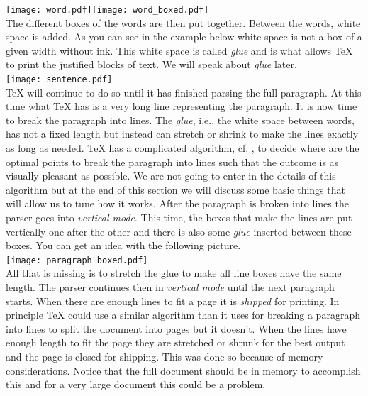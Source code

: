 \documentclass[a4paper]{article}
\begin{document}
\noindent\hfil\texttt{[image: word.pdf]}\hfil\texttt{[image: word\_boxed.pdf]}\hfil\\

\noindent The different boxes of the words are then put together. Between the words, white space is added. As you can see in the example below white space is not a box of a given width without ink. This white space is called \emph{glue} and is what allows \TeX{} to print the justified blocks of text. We will speak about \emph{glue} later.\\

\noindent\hfil\texttt{[image: sentence.pdf]}\hfil\\

\noindent \TeX{} will continue to do so until it has finished parsing the full paragraph. At this time what \TeX{} has is a very long line representing the paragraph. It is now time to break the paragraph into lines. The \emph{glue}, i.e., the white space between words, has not a fixed length but instead can stretch or shrink to make the lines exactly as long as needed. \TeX{} has a complicated algorithm, cf. \cite[Chapter~14]{Knuth1990}, to decide where are the optimal points to break the paragraph into lines such that the outcome is as visually pleasant as possible. We are not going to enter in the details of this algorithm but at the end of this section we will discuss some basic things that will allow us to tune how it works.
After the paragraph is broken into lines the parser goes into \emph{vertical mode}. This time, the boxes that make the lines are put vertically one after the other and there is also some \emph{glue} inserted between these boxes. You can get an idea with the following picture.\\ 

\noindent\hfil\texttt{[image: paragraph\_boxed.pdf]}\hfil\\

\noindent All that is missing is to stretch the glue to make all line boxes have the same length. The parser continues then in \emph{vertical mode} until the next paragraph starts. When there are enough lines to fit a page it is \emph{shipped} for printing. In principle \TeX{} could  use a similar algorithm than it uses for breaking a paragraph into lines to split the document into pages but it doesn't. When the lines have enough length to fit the page they are stretched or shrunk for the best output and the page is closed for shipping. This was done so because of memory considerations. Notice that the full document should be in memory to accomplish this and for a very large document this could be a problem.
\end{document}
